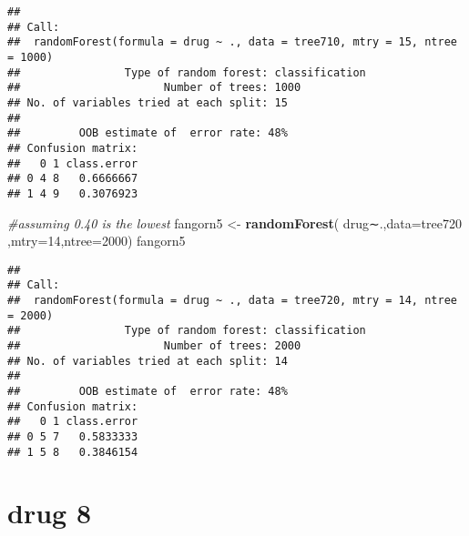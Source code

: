 \documentclass[]{article}
\newenvironment{Shaded}{\begin{snugshade}}{\end{snugshade}}
\newcommand{\KeywordTok}[1]{\textcolor[rgb]{0.13,0.29,0.53}{\textbf{#1}}}
\newcommand{\DataTypeTok}[1]{\textcolor[rgb]{0.13,0.29,0.53}{#1}}
\newcommand{\DecValTok}[1]{\textcolor[rgb]{0.00,0.00,0.81}{#1}}
\newcommand{\StringTok}[1]{\textcolor[rgb]{0.31,0.60,0.02}{#1}}
\newcommand{\CommentTok}[1]{\textcolor[rgb]{0.56,0.35,0.01}{\textit{#1}}}
\newcommand{\OperatorTok}[1]{\textcolor[rgb]{0.81,0.36,0.00}{\textbf{#1}}}
\newcommand{\NormalTok}[1]{#1}
\begin{document}
\begin{verbatim}
## 
## Call:
##  randomForest(formula = drug ~ ., data = tree710, mtry = 15, ntree = 1000) 
##                Type of random forest: classification
##                      Number of trees: 1000
## No. of variables tried at each split: 15
## 
##         OOB estimate of  error rate: 48%
## Confusion matrix:
##   0 1 class.error
## 0 4 8   0.6666667
## 1 4 9   0.3076923
\end{verbatim}

\begin{Shaded}
\begin{Highlighting}[]
\CommentTok{#assuming 0.40 is the lowest}
\NormalTok{fangorn5 <-}\StringTok{ }\KeywordTok{randomForest}\NormalTok{( drug∼.,}\DataTypeTok{data=}\NormalTok{tree720  ,}\DataTypeTok{mtry=}\DecValTok{14}\NormalTok{,}\DataTypeTok{ntree=}\DecValTok{2000}\NormalTok{)}
\NormalTok{fangorn5}
\end{Highlighting}
\end{Shaded}

\begin{verbatim}
## 
## Call:
##  randomForest(formula = drug ~ ., data = tree720, mtry = 14, ntree = 2000) 
##                Type of random forest: classification
##                      Number of trees: 2000
## No. of variables tried at each split: 14
## 
##         OOB estimate of  error rate: 48%
## Confusion matrix:
##   0 1 class.error
## 0 5 7   0.5833333
## 1 5 8   0.3846154
\end{verbatim}

\section{drug 8}\label{drug-8}

\begin{Shaded}
\end{Shaded}
\end{document}
